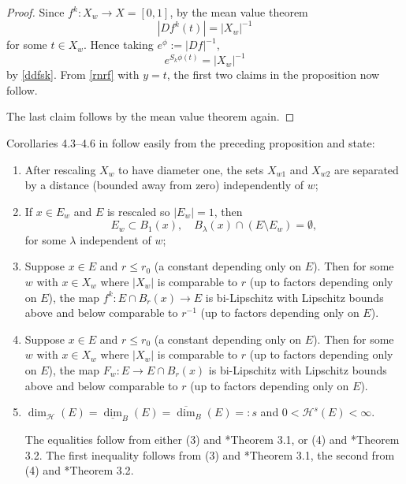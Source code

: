 \documentclass[a4paper]{amsart}
\theoremstyle{plain}
\theoremstyle{definition}
\theoremstyle{remark}
\begin{document}
\begin{proof} Since $ f^k:X_w \to X=[0,1] $, by the mean value theorem
\[
|Df^k(t)|=|X_w|^{-1} 
\]
for some $ t \in X_w $.
Hence taking $ e^\phi := |Df|^{-1}  $,
\[ e^{S_k\phi(t)} = |X_w|^{-1} \]
by  \eqref{ddfsk}.  From  \eqref{rnrf} with $ y=t $, the first two claims in the proposition now follow.

The last claim follows by the mean value theorem again.
\end{proof} 

\bigskip
\noindent Corollaries 4.3--4.6 in \cite{Fal} follow easily from the preceding proposition and state:
\begin{enumerate}

\item After rescaling $ X_w $ to have diameter one, the sets $ X_{w1} $ and $ X_{w2} $ are separated by a distance (bounded away from zero) independently of $ w $;

\item If $ x \in E_w $ and $ E $ is rescaled so $ |E_w|=1 $, then 
\[  E_w \subset B_1(x), \quad  B_\lambda (x) \cap (E\setminus E_w) = \emptyset, \]
for some $ \lambda $ independent of $ w $;

\item Suppose $ x \in E$ and $ r \leq r_0 $ (a  constant depending only on $ E $).  Then for some $ w $ with $ x \in X_w $ where $ |X_w| $ is comparable to $ r $ (up to factors depending only on $ E $), the map $ f^k:E\cap B_r(x) \to E $  is bi-Lipschitz  with Lipschitz bounds above and below comparable to $ r^{-1} $ (up to factors depending only on $ E $).

\item Suppose $ x \in E$ and $ r \leq r_0 $ (a  constant depending only on $ E $).  Then for some $ w $ with $ x \in X_w $ where $ |X_w| $ is comparable to $ r $ (up to factors depending only on $ E $), the map $ F_w:E\to E\cap B_r(x)   $  is bi-Lipschitz  with Lipschitz bounds above and below comparable to $ r $ (up to factors depending only on $ E $).

\item $   \dim_{\mathcal{H} }(E) = \underline{\dim}_B(E) = \overline{\dim}_B(E)=:s  $ and  $ 0 < \mathcal{H}^s(E) <\infty $. 

The equalities follow from either (3) and  \cite{Fal}*{Theorem 3.1}, or (4) and \cite{Fal}*{Theorem 3.2}.  The first inequality follows from  (3) and  \cite{Fal}*{Theorem 3.1}, the second from (4) and \cite{Fal}*{Theorem 3.2}.
\end{enumerate} 
\end{document}
